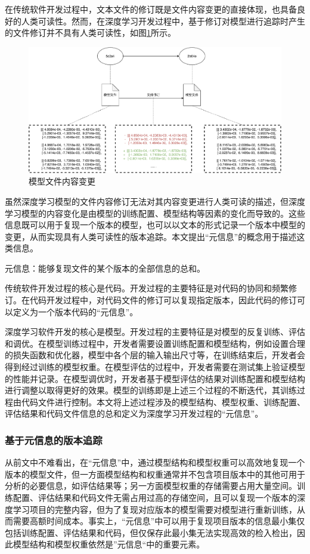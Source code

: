 \documentclass{cjc}
\begin{document}
在传统软件开发过程中，文本文件的修订既是文件内容变更的直接体现，也具备良好的人类可读性。然而，在深度学习开发过程中，基于修订对模型进行追踪时产生的文件修订并不具有人类可读性，如图\ref{modelrevision}所示。

\begin{figure}[htb]
  \centering
  \includegraphics[width=\linewidth]{modelrevision.pdf}
  \caption{模型文件内容变更}
  \label{modelrevision}
\end{figure}

虽然深度学习模型的文件内容修订无法对其内容变更进行人类可读的描述，但深度学习模型的内容变化是由模型的训练配置、模型结构等因素的变化而导致的。这些信息既可以用于复现一个版本的模型，也可以以文本的形式记录一个版本中模型的变更，从而实现具有人类可读性的版本追踪。本文提出“元信息”的概念用于描述这类信息。

\begin{definition}
元信息：能够复现文件的某个版本的全部信息的总和。
\end{definition}


传统软件开发过程的核心是代码。开发过程的主要特征是对代码的协同和频繁修订。在代码开发过程中，对代码文件的修订可以复现指定版本，因此代码的修订可以定义为一个版本代码的“元信息”。

深度学习软件开发的核心是模型。开发过程的主要特征是对模型的反复训练、评估和调优。在模型训练过程中，开发者需要设置训练配置和模型结构，例如设置合理的损失函数和优化器，模型中各个层的输入输出尺寸等，在训练结束后，开发者会得到经过训练的模型权重。在模型评估的过程中，开发者需要在测试集上验证模型的性能并记录。在模型调优时，开发者基于模型评估的结果对训练配置和模型结构进行调整以取得更好的效果。模型的训练即是上述三个过程的不断迭代，其训练过程由代码文件进行控制。本文将上述过程涉及的模型结构、模型权重、训练配置、评估结果和代码文件信息的总和定义为深度学习开发过程的“元信息”。

\subsubsection{基于元信息的版本追踪}
从前文中不难看出，在“元信息”中，通过模型结构和模型权重可以高效地复现一个版本的模型文件，但一方面模型结构和权重通常并不包含项目版本中的其他可用于分析的必要信息，如评估结果等；另一方面模型权重的存储需要占用大量空间。训练配置、评估结果和代码文件无需占用过高的存储空间，且可以复现一个版本的深度学习项目的完整内容，但为了复现对应版本的模型需要对模型进行重新训练，从而需要高额时间成本。事实上，“元信息”中可以用于复现项目版本的信息最小集仅包括训练配置、评估结果和代码，但仅保存此最小集无法实现高效的检入检出，因此模型结构和模型权重依然是”元信息“中的重要元素。
\end{document}
